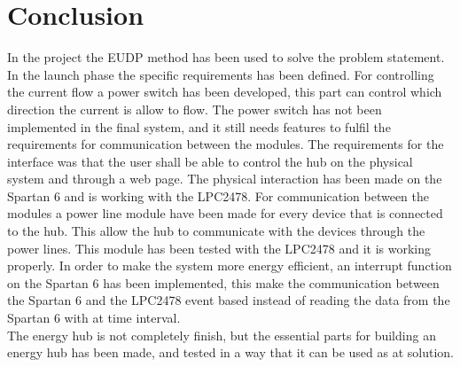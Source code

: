 \chapter{Conclusion}
In the project the EUDP method has been used to solve the problem statement. In the launch phase the specific requirements has been defined. For controlling the current flow a power switch has been developed, this part can control which direction the current is allow to flow. The power switch has not been implemented in the final system, and it still needs features to fulfil the requirements for communication between the modules. The requirements for the interface was that the user shall be able to control the hub on the physical system and through a web page. The physical interaction has been made on the Spartan 6 and is working with the LPC2478. For communication between the modules a power line module have been made for every device that is connected to the hub. This allow the hub to communicate with the devices through the power lines. This module has been tested with the LPC2478 and it is working properly. In order to make the system more energy efficient, an interrupt function on the Spartan 6 has been implemented, this make the communication between the Spartan 6 and the LPC2478 event based instead of reading the data from the Spartan 6 with at time interval.\\
The energy hub is not completely finish, but the essential parts for building an energy hub has been made, and tested in a way that it can be used as at solution.